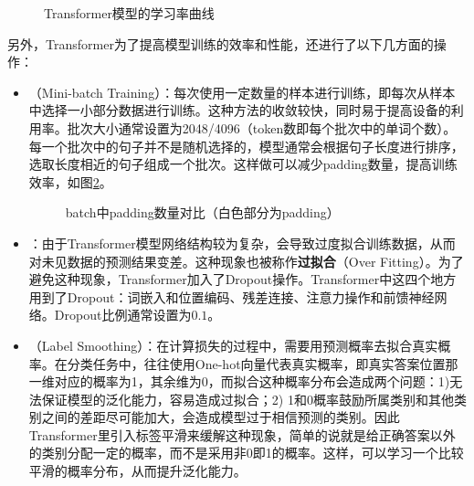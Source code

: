 \begin{figure}[htp]
\centering

\caption{Transformer模型的学习率曲线}
\label{fig:6-54}
\end{figure}

\parinterval 另外，Transformer为了提高模型训练的效率和性能，还进行了以下几方面的操作：

\begin{itemize}
\vspace{0.5em}
\item {\small{}}（Mini-batch Training）：每次使用一定数量的样本进行训练，即每次从样本中选择一小部分数据进行训练。这种方法的收敛较快，同时易于提高设备的利用率。批次大小通常设置为2048/4096（token数即每个批次中的单词个数）。每一个批次中的句子并不是随机选择的，模型通常会根据句子长度进行排序，选取长度相近的句子组成一个批次。这样做可以减少padding数量，提高训练效率，如图\ref{fig:6-55}。

\begin{figure}[htp]
\centering

\caption{batch中padding数量对比（白色部分为padding）}
\label{fig:6-55}
\end{figure}
\vspace{0.5em}
\item {\small{}}：由于Transformer模型网络结构较为复杂，会导致过度拟合训练数据，从而对未见数据的预测结果变差。这种现象也被称作{\small\sffamily\bfseries{过拟合}}（Over Fitting）。为了避免这种现象，Transformer加入了Dropout操作\cite{JMLR:v15:srivastava14a}。Transformer中这四个地方用到了Dropout：词嵌入和位置编码、残差连接、注意力操作和前馈神经网络。Dropout比例通常设置为$0.1$。
\vspace{0.5em}
\item {\small{}}（Label Smoothing）：在计算损失的过程中，需要用预测概率去拟合真实概率。在分类任务中，往往使用One-hot向量代表真实概率，即真实答案位置那一维对应的概率为1，其余维为0，而拟合这种概率分布会造成两个问题：1)无法保证模型的泛化能力，容易造成过拟合；2) 1和0概率鼓励所属类别和其他类别之间的差距尽可能加大，会造成模型过于相信预测的类别。因此Transformer里引入标签平滑\cite{Szegedy_2016_CVPR}来缓解这种现象，简单的说就是给正确答案以外的类别分配一定的概率，而不是采用非0即1的概率。这样，可以学习一个比较平滑的概率分布，从而提升泛化能力。
\vspace{0.5em}
\end{itemize}

